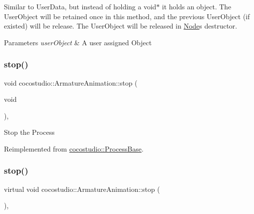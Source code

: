Similar to User\+Data, but instead of holding a void$\ast$ it holds an object. The User\+Object will be retained once in this method, and the previous User\+Object (if existed) will be release. The User\+Object will be released in \hyperlink{classNode}{Node}\textquotesingle{}s destructor.


\begin{DoxyParams}{Parameters}
{\em user\+Object} & A user assigned Object \\
\hline
\end{DoxyParams}
\mbox{\label{classcocostudio_1_1ArmatureAnimation_a4fed052a2b06d6ff7959d5e86c73044c}} 
\subsubsection{\texorpdfstring{stop()}{stop()}\hspace{0.1cm}{\footnotesize\ttfamily [1/2]}}
{\footnotesize\ttfamily void cocostudio\+::\+Armature\+Animation\+::stop (\begin{DoxyParamCaption}\item[{void}]{ }\end{DoxyParamCaption})\hspace{0.3cm}{\ttfamily [override]}, {\ttfamily [virtual]}}

Stop the Process 

Reimplemented from \hyperlink{classcocostudio_1_1ProcessBase_a1bc5907ac5300d031f2a3ab6d1ed2718}{cocostudio\+::\+Process\+Base}.

\mbox{\label{classcocostudio_1_1ArmatureAnimation_ae02f5a30490aa9782b52f89e27470128}} 
\subsubsection{\texorpdfstring{stop()}{stop()}\hspace{0.1cm}{\footnotesize\ttfamily [2/2]}}
{\footnotesize\ttfamily virtual void cocostudio\+::\+Armature\+Animation\+::stop (\begin{DoxyParamCaption}{ }\end{DoxyParamCaption})\hspace{0.3cm}{\ttfamily [override]}, {\ttfamily [virtual]}}

